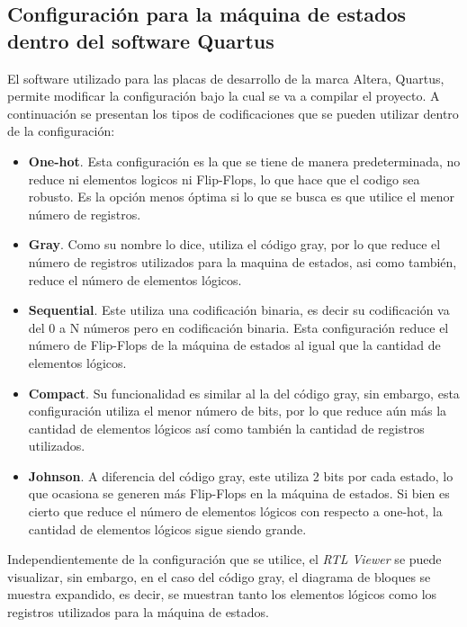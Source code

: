 \documentclass{article}
\begin{document}
\subsection{Configuración para la máquina de estados dentro del software Quartus}
El software utilizado para las placas de desarrollo de la marca Altera, Quartus, permite modificar la configuración bajo la cual se va a compilar el proyecto. A continuación se presentan los tipos de codificaciones que se pueden utilizar dentro de la configuración:
\begin{itemize}
    \item \textbf{One-hot}. Esta configuración es la que se tiene de manera predeterminada, no reduce ni elementos logicos ni Flip-Flops, lo que hace que el codigo sea robusto. Es la opción menos óptima si lo que se busca es que utilice el menor número de registros.
    \item \textbf{Gray}. Como su nombre lo dice, utiliza el código gray, por lo que reduce el número de registros utilizados para la maquina de estados, asi como también, reduce el número de elementos lógicos.
    \item \textbf{Sequential}. Este utiliza una codificación binaria, es decir su codificación va del 0 a N números pero en codificación binaria. Esta configuración reduce el número de Flip-Flops de la máquina de estados al igual que la cantidad de elementos lógicos.
    \item \textbf{Compact}. Su funcionalidad es similar al la del código gray, sin embargo, esta configuración utiliza el menor número de bits, por lo que reduce aún más la cantidad de elementos lógicos así como también la cantidad de registros utilizados.
    \item \textbf{Johnson}. A diferencia del código gray, este utiliza 2 bits por cada estado, lo que ocasiona se generen más Flip-Flops en la máquina de estados. Si bien es cierto que reduce el número de elementos lógicos con respecto a one-hot, la cantidad de elementos lógicos sigue siendo grande.
\end{itemize}
Independientemente de la configuración que se utilice, el \textit{RTL Viewer} se puede visualizar, sin embargo, en el caso del código gray, el diagrama de bloques se muestra expandido, es decir, se muestran tanto los elementos lógicos como los registros utilizados para la máquina de estados.
\end{document}
